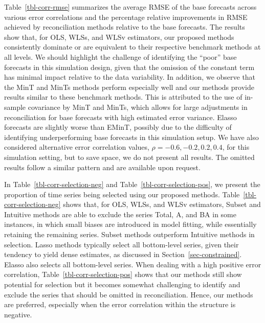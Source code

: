 \documentclass[
  11pt]{article}
\begin{document}
Table~\ref{tbl-corr-rmse} summarizes the average RMSE of the base
forecasts across various error correlations and the percentage relative
improvements in RMSE achieved by reconciliation methods relative to the
base forecasts. The results show that, for OLS, WLSs, and WLSv
estimators, our proposed methods consistently dominate or are equivalent
to their respective benchmark methods at all levels. We should highlight
the challenge of identifying the ``poor'' base forecasts in this
simulation design, given that the omission of the constant term has
minimal impact relative to the data variability. In addition, we observe
that the MinT and MinTs methods perform especially well and our methods
provide results similar to these benchmark methods. This is attributed
to the use of in-sample covariance by MinT and MinTs, which allows for
large adjustments in reconciliation for base forecasts with high
estimated error variance. Elasso forecasts are slightly worse than
EMinT, possibly due to the difficulty of identifying underperforming
base forecasts in this simulation setup. We have also considered
alternative error correlation values, \(\rho = -0.6, -0.2, 0.2, 0.4\),
for this simulation setting, but to save space, we do not present all
results. The omitted results follow a similar pattern and are available
upon request.

In Table~\ref{tbl-corr-selection-neg} and
Table~\ref{tbl-corr-selection-pos}, we present the proportion of time
series being selected using our proposed methods.
Table~\ref{tbl-corr-selection-neg} shows that, for OLS, WLSs, and WLSv
estimators, Subset and Intuitive methods are able to exclude the series
Total, A, and BA in some instances, in which small biases are introduced
in model fitting, while essentially retaining the remaining series.
Subset methods outperform Intuitive methods in selection. Lasso methods
typically select all bottom-level series, given their tendency to yield
dense estimates, as discussed in Section~\ref{sec-constrained}. Elasso
also selects all bottom-level series. When dealing with a high positive
error correlation, Table~\ref{tbl-corr-selection-pos} shows that our
methods still show potential for selection but it becomes somewhat
challenging to identify and exclude the series that should be omitted in
reconciliation. Hence, our methods are preferred, especially when the
error correlation within the structure is negative.
\end{document}
